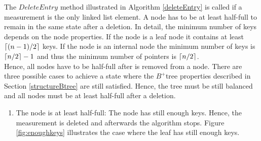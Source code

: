 \documentclass[abstracton,12pt,oneside]{scrreprt}
\DeclarePairedDelimiter\ceil{\lceil}{\rceil}
\begin{document}
\BlankLine
The $DeleteEntry$ method illustrated in Algorithm \ref{deleteEntry} is called if a measurement is the only linked list element. A node has to be at least half-full to remain in the same state after a deletion. In detail, the minimum number of keys depends on the node properties. If the node is a leaf node it contains at least $\ceil{(n-1)/2}$ keys. If the node is an internal node the minimum number of keys is $\ceil{n/2}-1$ and thus the minimum number of pointers is $\ceil{n/2}$. \\ 
Hence, all nodes have to be half-full after is removed from a node. There are three possible cases to achieve a state where the $B^+$tree properties described in Section \ref{structureBtree} are still satisfied. Hence, the tree must be still balanced and all nodes must be at least half-full after a deletion.
\begin{enumerate}
	\item The node is at least half-full: The node has still enough keys. Hence, the measurement is deleted and afterwards the algorithm stops. Figure \ref{fig:enoughkeys} illustrates the case where the leaf has still enough keys. 
	\begin{figure}[H]
		\centering
\end{figure}
\end{enumerate}
\end{document}
